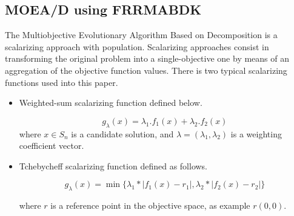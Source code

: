 \documentclass{article}
\newcommand\tab[1][0.6cm]{\hspace*{#1}}
\begin{document}
\subsection{MOEA/D using FRRMABDK}

\tab The Multiobjective Evolutionary Algorithm Based on Decomposition \citep{DBLP:journals/tec/ZhangL07} is a scalarizing approach with population. Scalarizing approaches consist in transforming the original problem into a single-objective one by means of an aggregation of the objective function values. There is two typical scalarizing functions used into this paper. 

\begin{itemize}
    \item
        Weighted-sum scalarizing function \citep{DBLP:conf/emo/LiefoogheDVAT17} defined below.
        
        $$g_\lambda(x) = \lambda_1.f_1(x) + \lambda_2.f_2(x)$$
        where $x \in S_n$ is a candidate solution, and $\lambda = (\lambda_1, \lambda_2)$ is a weighting coefficient vector. 
    \item 
        Tchebycheff scalarizing function defined as follows.
        
        $$g_{\lambda} (x) = \min \bigg\{ \lambda_1 * |f_1(x) - r_1|, \lambda_2 * |f_2(x) - r_2| \bigg\} $$
        
        where $r$ is a reference point in the objective space, as example $r(0,0)$. 
\end{itemize}

\vspace{3mm}
\end{document}
